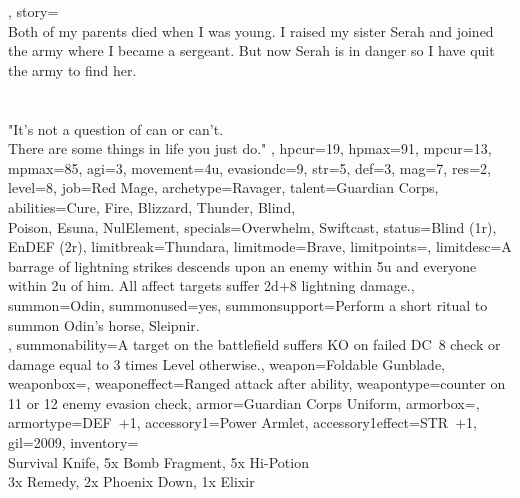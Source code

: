{{\begin{multicols}{2}
		\end{multicols}
		\vspace*{-0.9cm}
	},
	story={\\
		Both of my parents died when I was young. 
		I raised my sister Serah and joined the army where I became a sergeant. 
		But now Serah is in danger so I have quit the army to find her. \\\\\\
		"It's not a question of can or can't.\\ There are some things in life you just do."
	},
	hpcur=19, hpmax=91, mpcur=13, mpmax=85, agi=3, movement=4u, evasiondc=9, str=5, def=3, mag=7, res=2, 
	level=8, job=Red Mage, archetype=Ravager\phantom{1234567}, talent=Guardian Corps,
	abilities={Cure, Fire, Blizzard, Thunder, Blind,\\ Poison, Esuna, NulElement},
	specials={Overwhelm, Swiftcast}, status={Blind (1r), EnDEF (2r)},
	limitbreak=Thundara, limitmode=Brave, limitpoints=\ofcslimitbarfilled, 
	limitdesc={A barrage of lightning strikes descends upon an enemy within 5u and everyone within 2u of him. All affect targets suffer 2d+8 lightning damage.},
	summon=Odin, summonused=yes, summonsupport={Perform a short ritual to summon Odin's horse, Sleipnir.\\}, summonability={A target on the battlefield suffers KO on failed DC~8 check or damage equal to 3 times Level otherwise.},
	weapon=Foldable Gunblade, weaponbox=\ofcsweaponboxexpert, weaponeffect=Ranged attack after ability, weapontype=counter on 11 or 12 enemy evasion check, armor=Guardian Corps Uniform, armorbox=\ofcsarmorboxbeginner, armortype=DEF~+1, accessory1=Power Armlet, accessory1effect=STR~+1,
	gil=2009, inventory={\\Survival Knife, 5x Bomb Fragment, 5x Hi-Potion\\ 3x Remedy, 2x Phoenix Down, 1x Elixir}
}
%
\clearpage